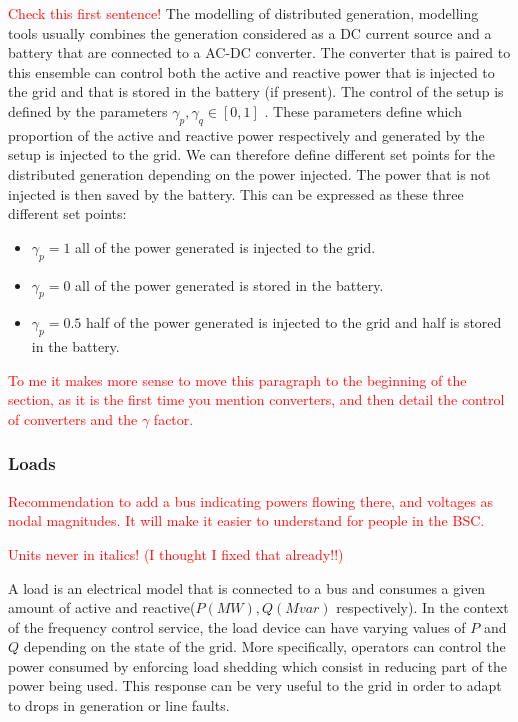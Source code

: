 \documentclass{article}
\begin{document}
\textcolor{red}{Check this first sentence!}
The modelling of distributed generation, modelling tools usually combines the generation considered as a DC current source and a battery that are connected to a AC-DC converter. The converter that is paired to this ensemble can control both the active and reactive power that is injected to the grid and that is stored in the battery (if present). The control of the setup is defined by the parameters $\gamma_p, \gamma_q \in [0,1]$ . These parameters define which proportion of the active and reactive power respectively and generated by the setup is injected to the grid. We can therefore define different set points for the distributed generation depending on the power injected. The power that is not injected is then saved by the battery. This can be expressed as these three different set points:

\begin{itemize}
    \item $\gamma_p = 1$ all of the power generated is injected to the grid.
    \item $\gamma_p = 0$ all of the power generated is stored in the battery.
    \item $\gamma_p = 0.5$ half of the power generated is injected to the grid and half is stored in the battery.
\end{itemize}

\textcolor{red}{To me it makes more sense to move this paragraph to the beginning of the section, as it is the first time you mention converters, and then detail the control of converters and the $\gamma$ factor.}

\subsubsection*{Loads}
\textcolor{red}{Recommendation to add a bus indicating powers flowing there, and voltages as nodal magnitudes. It will make it easier to understand for people in the BSC.}

\textcolor{red}{Units never in italics! (I thought I fixed that already!!)}

A load is an electrical model that is connected to a bus and consumes a given amount of active and reactive($P(MW),  Q (Mvar)$ respectively). In the context of the frequency control service, the load device can have varying values of $P$ and $Q$ depending on the state of the grid. More specifically, operators can control the power consumed by enforcing load shedding which consist in reducing part of the power being used. This response can be very useful to the grid in order to adapt to drops in generation or line faults.
\end{document}
